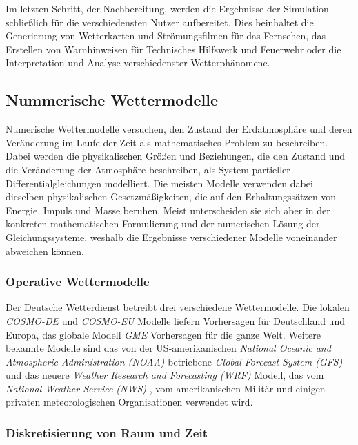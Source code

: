 Im letzten Schritt, der Nachbereitung, werden die Ergebnisse der
Simulation schließlich für die verschiedensten Nutzer
aufbereitet. Dies beinhaltet die Generierung von Wetterkarten und
Strömungsfilmen für das Fernsehen, das Erstellen von Warnhinweisen für
Technisches Hilfswerk und Feuerwehr oder die Interpretation und
Analyse verschiedenster Wetterphänomene.

\subsection{Nummerische Wettermodelle}
Numerische Wettermodelle versuchen, den Zustand der Erdatmosphäre und
deren Veränderung im Laufe der Zeit als mathematisches Problem zu
beschreiben. Dabei werden die physikalischen Größen und Beziehungen,
die den Zustand und die Veränderung der Atmosphäre beschreiben, als
System partieller Differentialgleichungen modelliert. Die meisten
Modelle verwenden dabei dieselben physikalischen Gesetzmäßigkeiten,
die auf den Erhaltungssätzen von Energie, Impuls und Masse
beruhen. Meist unterscheiden sie sich aber in der konkreten
mathematischen Formulierung und der numerischen Lösung der
Gleichungssysteme, weshalb die Ergebnisse verschiedener Modelle
voneinander abweichen können.

\subsubsection{Operative Wettermodelle}

Der Deutsche Wetterdienst betreibt drei verschiedene
Wettermodelle. Die lokalen \textit{COSMO-DE} und \textit{COSMO-EU}
Modelle liefern Vorhersagen für Deutschland und Europa, das globale
Modell \textit{GME} Vorhersagen für die ganze Welt. Weitere bekannte
Modelle sind das von der US-amerikanischen \textit{National Oceanic
  and Atmospheric Administration (NOAA)} betriebene \textit{Global
  Forecast System (GFS)} 
und das neuere \textit{Weather Research and Forecasting (WRF)}
 Modell, das vom
\textit{National Weather Service (NWS)} , vom amerikanischen Militär und einigen privaten
meteorologischen Organisationen verwendet wird.

\subsubsection{Diskretisierung von Raum und Zeit}

